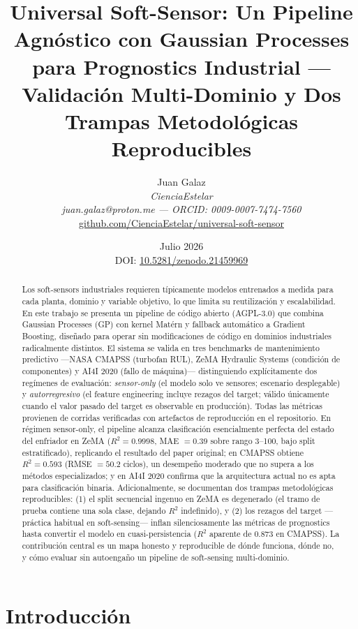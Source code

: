 \documentclass[10pt]{article}
\title{\textbf{Universal Soft-Sensor: Un Pipeline Agnóstico con Gaussian Processes para Prognostics Industrial --- Validación Multi-Dominio y Dos Trampas Metodológicas Reproducibles}}
\author{Juan Galaz\\
\textit{CienciaEstelar}\\
\textit{juan.galaz@proton.me — ORCID: 0009-0007-7474-7560}\\
\href{https://github.com/CienciaEstelar/universal-soft-sensor}{github.com/CienciaEstelar/universal-soft-sensor}}
\date{Julio 2026\\[2pt]
\small DOI: \href{https://doi.org/10.5281/zenodo.21459969}{10.5281/zenodo.21459969}}
\begin{document}
\maketitle

\begin{abstract}
Los soft-sensors industriales requieren típicamente modelos entrenados a medida para cada planta, dominio y variable objetivo, lo que limita su reutilización y escalabilidad. En este trabajo se presenta un pipeline de código abierto (AGPL-3.0) que combina Gaussian Processes (GP) con kernel Matérn y fallback automático a Gradient Boosting, diseñado para operar sin modificaciones de código en dominios industriales radicalmente distintos. El sistema se valida en tres benchmarks de mantenimiento predictivo ---NASA CMAPSS (turbofan RUL), ZeMA Hydraulic Systems (condición de componentes) y AI4I 2020 (fallo de máquina)--- distinguiendo explícitamente dos regímenes de evaluación: \emph{sensor-only} (el modelo solo ve sensores; escenario desplegable) y \emph{autorregresivo} (el feature engineering incluye rezagos del target; válido únicamente cuando el valor pasado del target es observable en producción). Todas las métricas provienen de corridas verificadas con artefactos de reproducción en el repositorio. En régimen sensor-only, el pipeline alcanza clasificación esencialmente perfecta del estado del enfriador en ZeMA ($R^2 = 0.9998$, MAE $= 0.39$ sobre rango 3--100, bajo split estratificado), replicando el resultado del paper original; en CMAPSS obtiene $R^2 = 0.593$ (RMSE $= 50.2$ ciclos), un desempeño moderado que no supera a los métodos especializados; y en AI4I 2020 confirma que la arquitectura actual no es apta para clasificación binaria. Adicionalmente, se documentan dos trampas metodológicas reproducibles: (1) el split secuencial ingenuo en ZeMA es degenerado (el tramo de prueba contiene una sola clase, dejando $R^2$ indefinido), y (2) los rezagos del target ---práctica habitual en soft-sensing--- inflan silenciosamente las métricas de prognostics hasta convertir el modelo en cuasi-persistencia ($R^2$ aparente de 0.873 en CMAPSS). La contribución central es un mapa honesto y reproducible de dónde funciona, dónde no, y cómo evaluar sin autoengaño un pipeline de soft-sensing multi-dominio.
\end{abstract}

\section{Introducción}
\end{document}

